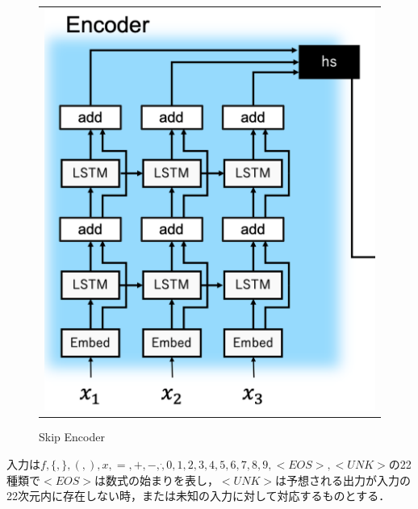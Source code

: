 \documentclass[a4paper,twocolumn]{jsarticle}
\begin{document}
\begin{figure}[htpb]
\begin{tabular}{c}
    \begin{minipage}{0.33\hsize}
      \centering
      \includegraphics[width=\linewidth]{image/Skipconnect_encoder.png}
      \caption{Skip Encoder}
      \label{fig:SkipSeq2seq}
    \end{minipage}


  \end{tabular}
\end{figure}

入力は$f,\{,\},(,),x,=,+,-,\dot,0,1,2,3,4,5,6,7,8,9,<EOS>,<UNK>$の22種類で$<EOS>$は数式の始まりを表し，$<UNK>$は予想される出力が入力の22次元内に存在しない時，または未知の入力に対して対応するものとする．
\end{document}
